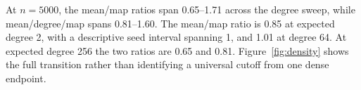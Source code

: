 At $n=5000$, the mean/map ratios span 0.65--1.71 across the degree sweep, while mean/degree/map spans 0.81--1.60. The mean/map ratio is 0.85 at expected degree 2, with a descriptive seed interval spanning 1, and 1.01 at degree 64. At expected degree 256 the two ratios are 0.65 and 0.81. Figure~\ref{fig:density} shows the full transition rather than identifying a universal cutoff from one dense endpoint.
